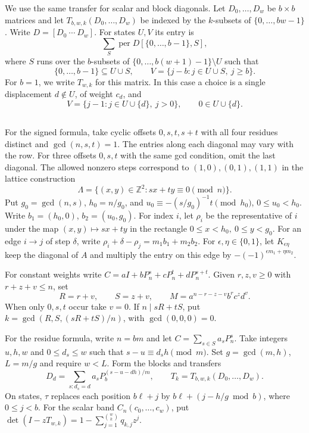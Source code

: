 \documentclass[11pt,reqno]{amsart}
\theoremstyle{remark}
\numberwithin{equation}{section}
\newcommand{\per}{\operatorname{per}}
\newcommand{\Z}{\mathbb Z}
\begin{document}
We use the same transfer for scalar and block diagonals. Let
\(D_0,\ldots,D_w\) be \(b\times b\) matrices and let
\(T_{b,w,k}(D_0,\ldots,D_w)\) be indexed by the \(k\)-subsets
of \(\{0,\ldots,bw-1\}\). Write \(D=[D_0\ \cdots\ D_w]\).
For states \(U,V\) its entry is
\begin{equation}\label{eq:block-transition}
 \sum_S\per D[\{0,\ldots,b-1\},S],
\end{equation}
where \(S\) runs over the \(b\)-subsets of
\(\{0,\ldots,b(w+1)-1\}\setminus U\) such that
\[
 \{0,\ldots,b-1\}\subseteq U\cup S,\qquad
 V=\{j-b:j\in U\cup S,\ j\ge b\}.
\]
For \(b=1\), we write \(T_{w,k}\) for this matrix. In this case a choice is a single
displacement \(d\notin U\), of weight \(c_d\), and
\begin{equation}\label{eq:band-transition}
 V=\{j-1:j\in U\cup\{d\},\ j>0\},\qquad 0\in U\cup\{d\}.
\end{equation}

\subsection{}

For the signed formula, take cyclic offsets \(0,s,t,s+t\)
with all four residues distinct and \(\gcd(n,s,t)=1\).
The entries along each diagonal may vary with the row.
For three offsets \(0,s,t\) with the same gcd condition,
omit the last diagonal. The allowed nonzero steps correspond
to \((1,0),(0,1),(1,1)\) in the lattice construction
\[
 \Lambda=\{(x,y)\in\Z^2:sx+ty\equiv0\pmod n\}.
\]
Put \(g_0=\gcd(n,s)\), \(h_0=n/g_0\), and
\(u_0\equiv-(s/g_0)^{-1}t\pmod{h_0}\), \(0\le u_0<h_0\).
Write \(b_1=(h_0,0)\), \(b_2=(u_0,g_0)\).
For index \(i\), let \(\rho_i\) be the representative of \(i\)
under the map \((x,y)\mapsto sx+ty\) in the rectangle
\(0\le x<h_0,\ 0\le y<g_0\).
For an edge \(i\to j\) of step \(\delta\), write
\(\rho_i+\delta-\rho_j=m_1b_1+m_2b_2\).
For \(\epsilon,\eta\in\{0,1\}\), let \(K_{\epsilon\eta}\)
keep the diagonal of \(A\) and multiply the entry on this edge
by \(-(-1)^{\epsilon m_1+\eta m_2}\).

For constant weights write \(C=aI+bP_n^s+cP_n^t+dP_n^{s+t}\).
Given \(r,z,v\ge0\) with \(r+z+v\le n\), set
\[
 R=r+v,\qquad S=z+v,\qquad M=a^{n-r-z-v}b^rc^zd^v.
\]
When only \(0,s,t\) occur take \(v=0\). If \(n\mid sR+tS\), put
\(k=\gcd(R,S,(sR+tS)/n)\), with \(\gcd(0,0,0)=0\).

For the residue formula, write \(n=bm\) and let
\(C=\sum_{s\in S}a_sP_n^s\). Take integers \(u,h,w\) and
\(0\le d_s\le w\) such that \(s-u\equiv d_s h\pmod m\).
Set \(g=\gcd(m,h)\), \(L=m/g\) and require \(w<L\). Form the blocks
and transfers
\[
 D_d=\sum_{s:d_s=d}a_sP_b^{(s-u-dh)/m},\qquad
 T_k=T_{b,w,k}(D_0,\ldots,D_w).
\]
On states, \(\tau\) replaces each position \(b\ell+j\) by
\(b\ell+(j-h/g\bmod b)\), where \(0\le j<b\).
For the scalar band \(C_n(c_0,\ldots,c_w)\), put
\(\det(I-zT_{w,k})=1-\sum_{j=1}^{\binom wk}q_{k,j}z^j\).
\end{document}
